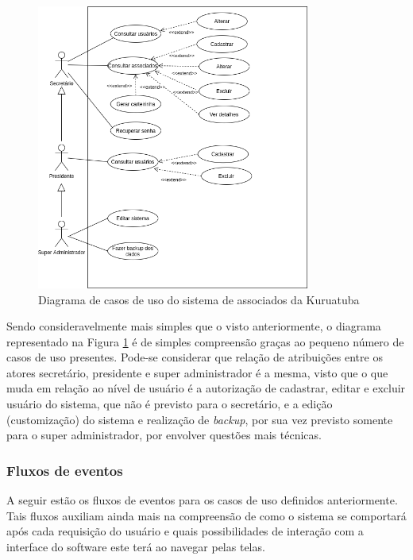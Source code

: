 \begin{figure}[htb]
 \centering
 \caption{Diagrama de casos de uso do sistema de associados da Kuruatuba}
 \includegraphics[width=0.8\textwidth]{figuras/use-case-sistema.png}
 
 \label{use-case-sistema}
\end{figure}

Sendo consideravelmente mais simples que o visto anteriormente, o diagrama representado na Figura \ref{use-case-sistema} é de simples compreensão graças ao pequeno número de casos de uso presentes. Pode-se considerar que relação de atribuições entre os atores secretário,  presidente e super administrador é a mesma, visto que o que muda em relação ao nível de usuário é a autorização de cadastrar, editar e excluir usuário do sistema, que não é previsto para o secretário, e a edição (customização) do sistema e realização de \textit{backup}, por sua vez previsto somente para o super administrador, por envolver questões mais técnicas.

\hspace{2.5cm}
\subsubsection{Fluxos de eventos}
\label{subsubsec:fluxos}
\hspace{2.5cm}

A seguir estão os fluxos de eventos para os casos de uso definidos anteriormente. Tais fluxos auxiliam ainda mais na compreensão de como o sistema se comportará após cada requisição do usuário e quais possibilidades de interação com a interface do software este terá ao navegar pelas telas. 

